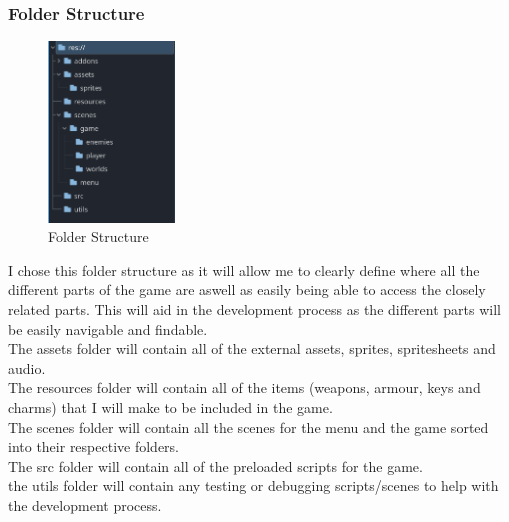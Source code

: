 \documentclass{article}
\begin{document}
        \subsubsection{Folder Structure}
        \begin{figure}[H]
                \centering
                \includegraphics[width = 0.3\textwidth]{images/design/File_System.PNG}
                \caption{Folder Structure}
        \end{figure}
        I chose this folder structure as it will allow me to clearly define where all the different parts of the game are aswell as easily being able to access the closely related parts. This will aid in the development process as the different parts will be easily navigable and findable.\\
        The assets folder will contain all of the external assets, sprites, spritesheets and audio.\\
        The resources folder will contain all of the items (weapons, armour, keys and charms) that I will make to be included in the game.\\
        The scenes folder will contain all the scenes for the menu and the game sorted into their respective folders.\\
        The src folder will contain all of the preloaded scripts for the game.\\
        the utils folder will contain any testing or debugging scripts/scenes to help with the development process.\\
\end{document}
